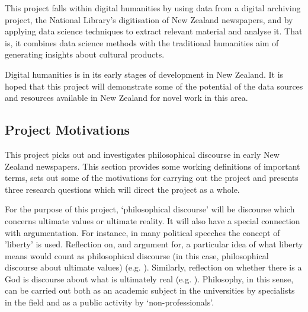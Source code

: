 \documentclass{article}
\begin{document}
This project falls within digital humanities by using data from a digital archiving project, the National Library's digitisation of New Zealand newspapers, and by applying data science techniques to extract relevant material and analyse it. That is, it combines data science methods with the traditional humanities aim of generating insights about cultural products.

Digital humanities is in its early stages of development in New Zealand. It is hoped that this project will demonstrate some of the potential of the data sources and resources available in New Zealand for novel work in this area.

\subsection{Project Motivations}\label{s:project-motivations}

This project picks out and investigates philosophical discourse in early New Zealand newspapers. This section provides some working definitions of important terms, sets out some of the motivations for carrying out the project and presents three research questions which will direct the project as a whole.

For the purpose of this project, `philosophical discourse' will be discourse which concerns ultimate values or ultimate reality. It will also have a special connection with argumentation. For instance, in many political speeches the concept of 'liberty' is used. Reflection on, and argument for, a particular idea of what liberty means would count as philosophical discourse (in this case, philosophical discourse about ultimate values) (e.g. \cite{bruce-liberty}). Similarly, reflection on whether there is a God is discourse about what is ultimately real (e.g. \cite{oxford-god}). Philosophy, in this sense, can be carried out both as an academic subject in the universities by specialists in the field and as a public activity by `non-professionals'.
\end{document}
